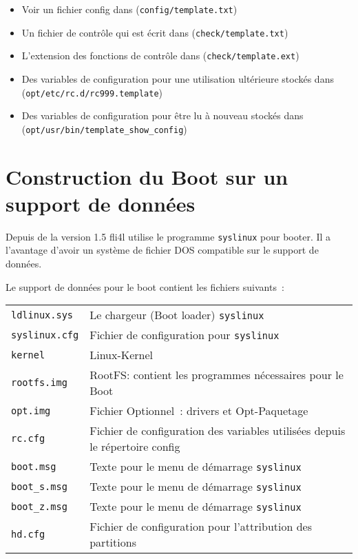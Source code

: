 \begin{itemize}
\item Voir un fichier config dans (\texttt{config/template.txt})
\item Un fichier de contrôle qui est écrit dans (\texttt{check/template.txt})
\item L’extension des fonctions de contrôle dans (\texttt{check/template.ext})
\item Des variables de configuration pour une utilisation ultérieure
  stockés dans\\ (\texttt{opt/etc/rc.d/rc999.template})
\item Des variables de configuration pour être lu à nouveau stockés dans\\
  (\texttt{opt/usr/bin/template\_show\_config})
\end{itemize}

\section{Construction du Boot sur un support de données}

Depuis de la version 1.5 fli4l utilise le programme \texttt{syslinux} pour booter.
Il a l'avantage d'avoir un système de fichier DOS compatible sur le support
de données.

Le support de données pour le boot contient les fichiers suivants~:

\begin{table}[htbp]
\centering
\begin{tabular}[h!]{lp{10cm}}
\texttt{ldlinux.sys}           & Le chargeur (\og{}Boot loader\fg{}) \texttt{syslinux} \\
\texttt{syslinux.cfg}          & Fichier de configuration pour \texttt{syslinux} \\
\texttt{kernel}                & Linux-Kernel\\
\texttt{rootfs.img}            & RootFS: contient les programmes nécessaires pour le Boot \\
\texttt{opt.img}               & Fichier Optionnel~: drivers et Opt-Paquetage \\
\texttt{rc.cfg}                & Fichier de configuration des variables utilisées depuis
le répertoire config \\
\texttt{boot.msg}              & Texte pour le menu de démarrage \texttt{syslinux} \\
\texttt{boot\_s.msg}           & Texte pour le menu de démarrage \texttt{syslinux} \\
\texttt{boot\_z.msg}           & Texte pour le menu de démarrage \texttt{syslinux} \\
\texttt{hd.cfg}                & Fichier de configuration pour l'attribution des partitions \\
\end{tabular}
\end{table}

